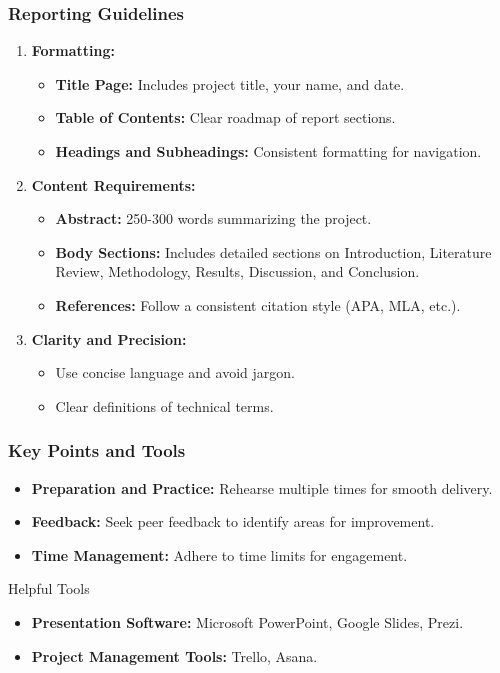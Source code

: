 \documentclass[aspectratio=169]{beamer}
\begin{document}
\begin{frame}[fragile]
    \frametitle{Reporting Guidelines}
    \begin{enumerate}
        \item \textbf{Formatting:}
            \begin{itemize}
                \item \textbf{Title Page:} Includes project title, your name, and date.
                \item \textbf{Table of Contents:} Clear roadmap of report sections.
                \item \textbf{Headings and Subheadings:} Consistent formatting for navigation.
            \end{itemize}
        \item \textbf{Content Requirements:}
            \begin{itemize}
                \item \textbf{Abstract:} 250-300 words summarizing the project.
                \item \textbf{Body Sections:} Includes detailed sections on Introduction, Literature Review, Methodology, Results, Discussion, and Conclusion.
                \item \textbf{References:} Follow a consistent citation style (APA, MLA, etc.).
            \end{itemize}
        \item \textbf{Clarity and Precision:}
            \begin{itemize}
                \item Use concise language and avoid jargon.
                \item Clear definitions of technical terms.
            \end{itemize}
    \end{enumerate}
\end{frame}

\begin{frame}[fragile]
    \frametitle{Key Points and Tools}
    \begin{itemize}
        \item \textbf{Preparation and Practice:} Rehearse multiple times for smooth delivery.
        \item \textbf{Feedback:} Seek peer feedback to identify areas for improvement.
        \item \textbf{Time Management:} Adhere to time limits for engagement.
    \end{itemize}
    \begin{block}{Helpful Tools}
        \begin{itemize}
            \item \textbf{Presentation Software:} Microsoft PowerPoint, Google Slides, Prezi.
            \item \textbf{Project Management Tools:} Trello, Asana.
        \end{itemize}
    \end{block}
\end{frame}
\end{document}

